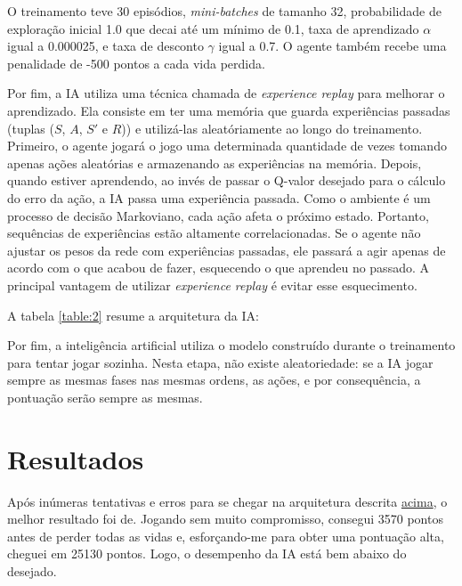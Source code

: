 O treinamento teve 30 episódios, \textit{mini-batches} de tamanho 32, probabilidade de exploração inicial 1.0 que decai até um mínimo de 0.1, taxa de aprendizado $\alpha$ igual a 0.000025, e taxa de desconto $\gamma$ igual a 0.7. O agente também recebe uma penalidade de -500 pontos a cada vida perdida.

Por fim, a IA utiliza uma técnica chamada de \textit{experience replay} para melhorar o aprendizado. Ela consiste em ter uma memória que guarda experiências passadas (tuplas ($S$, $A$, $S'$ e $R$)) e utilizá-las aleatóriamente ao longo do treinamento.
Primeiro, o agente jogará o jogo uma determinada quantidade de vezes tomando apenas ações aleatórias e armazenando as experiências na memória.
Depois, quando estiver aprendendo, ao invés de passar o Q-valor desejado para o cálculo do erro da ação, a IA passa uma experiência passada.
Como o ambiente é um processo de decisão Markoviano, cada ação afeta o próximo estado. Portanto, sequências de experiências estão altamente correlacionadas. Se o agente não ajustar os pesos da rede com experiências passadas, ele passará a agir apenas de acordo com o que acabou de fazer, esquecendo o que aprendeu no passado.
A principal vantagem de utilizar \textit{experience replay} é evitar esse esquecimento.

A tabela \ref{table:2} resume a arquitetura da IA:

Por fim, a inteligência artificial utiliza o modelo construído durante o treinamento para tentar jogar sozinha. Nesta etapa, não existe aleatoriedade: se a IA jogar sempre as mesmas fases nas mesmas ordens, as ações, e por consequência, a pontuação serão sempre as mesmas.

\section{Resultados}
\label{sec:res}

Após inúmeras tentativas e erros para se chegar na arquitetura descrita \hyperref[table:2]{acima}, o melhor resultado foi de.
Jogando sem muito compromisso, consegui 3570 pontos antes de perder todas as vidas e, esforçando-me para obter uma pontuação alta, cheguei em 25130 pontos. Logo, o desempenho da IA está bem abaixo do desejado.
